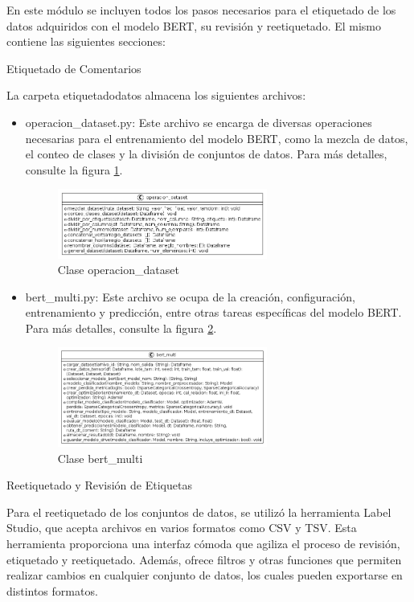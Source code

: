 En este módulo se incluyen todos los pasos necesarios para el etiquetado de los datos adquiridos con el modelo BERT, su revisión y reetiquetado. El mismo contiene las siguientes secciones:

Etiquetado de Comentarios

La carpeta etiquetadodatos almacena los siguientes archivos:

\begin{itemize}

\item operacion\_dataset.py: Este archivo se encarga de diversas operaciones necesarias para el entrenamiento del modelo BERT, como la mezcla de datos, el conteo de clases y la división de conjuntos de datos. Para más detalles, consulte la figura \ref{fig:uml5}.

\begin{figure}
	\includegraphics[width=0.65\textwidth]{capitulo5/figuras/fig5.png}
	\caption{Clase operacion\_dataset}
	\label{fig:uml5}
\end{figure}

\item bert\_multi.py: Este archivo se ocupa de la creación, configuración, entrenamiento y predicción, entre otras tareas específicas del modelo BERT. Para más detalles, consulte la figura \ref{fig:uml6}.

\begin{figure}
	\includegraphics[width=0.65\textwidth]{capitulo5/figuras/fig6.png}
	\caption{Clase bert\_multi}
	\label{fig:uml6}
\end{figure}

\end{itemize}

Reetiquetado y Revisión de Etiquetas

Para el reetiquetado de los conjuntos de datos, se utilizó la herramienta Label Studio, que acepta archivos en varios formatos como CSV y TSV. Esta herramienta proporciona una interfaz cómoda que agiliza el proceso de revisión, etiquetado y reetiquetado. Además, ofrece filtros y otras funciones que permiten realizar cambios en cualquier conjunto de datos, los cuales pueden exportarse en distintos formatos.


